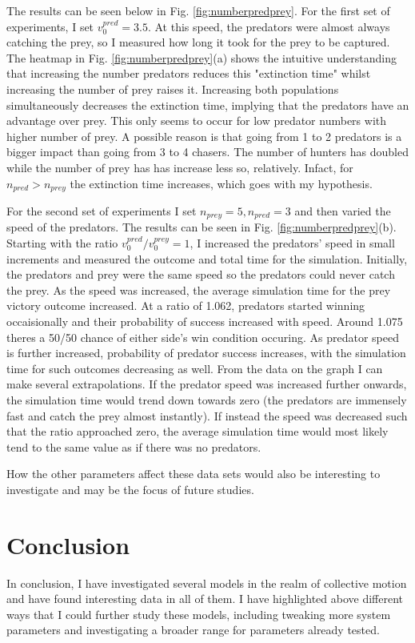 \documentclass[%
11pt,
amsmath, amssymb,
aps,
pra
]{revtex4-2}
\begin{document}
The results can be seen below in Fig. \ref{fig:numberpredprey}. For the first set of experiments, I set \(v_0^{pred}=3.5\).
At this speed, the predators were almost always catching the prey, so I measured how long it took for the prey to be captured.
The heatmap in Fig. \ref{fig:numberpredprey}(a) shows the intuitive understanding that increasing the number predators reduces
this "extinction time" whilst increasing the number of prey raises it. Increasing both populations simultaneously decreases
the extinction time, implying that the predators have an advantage over prey. This only seems to occur for low predator 
numbers with higher number of prey. A possible reason is that going from 1 to 2 predators is a bigger impact than going from
3 to 4 chasers. The number of hunters has doubled while the number of prey has has increase less so, relatively. 
Infact, for \(n_{pred} > n_{prey}\) the extinction time increases, which goes with my hypothesis.

For the second set of experiments I set \(n_{prey}=5, n_{pred} = 3\) and then varied the speed of the predators. The results
can be seen in Fig. \ref{fig:numberpredprey}(b). Starting with the ratio \(v_0^{pred}/v_0^{prey}=1\), I increased the 
predators' speed in small increments and measured the outcome and total time for the simulation. Initially,
the predators and prey were the same speed so the predators could never catch the prey. As the speed was increased, the
average simulation time for the prey victory outcome increased. At a ratio of 1.062, predators started winning occaisionally and
their probability of success increased with speed. Around 1.075 theres a 50/50 chance of either side's win condition occuring.
As predator speed is further increased, probability of predator success increases, with the simulation time for such
outcomes decreasing as well. From the data on the graph I can make several extrapolations. If the predator speed was increased
further onwards, the simulation time would trend down towards zero (the predators are immensely fast and catch the prey almost instantly).
If instead the speed was decreased such that the ratio approached zero, the average simulation time would most likely tend
to the same value as if there was no predators.

How the other parameters affect these data sets would also be interesting to investigate and may be the focus of future studies.


\section{Conclusion}
In conclusion, I have investigated several models in the realm of collective motion and have found interesting data in all of them.
I have highlighted above different ways that I could further study these models, including tweaking more system 
parameters and investigating a broader range for parameters already tested.
\end{document}
